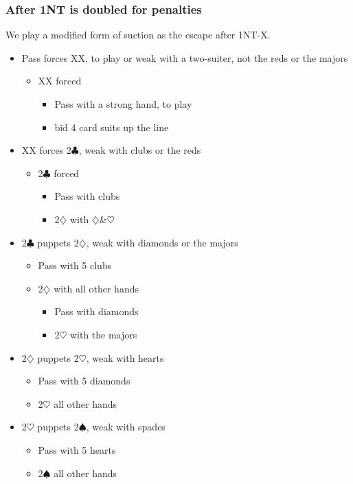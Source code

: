 \documentclass[a4paper,14pt]{extarticle}
\begin{document}
\newpage

\subsubsection{After 1NT is doubled for penalties}
\label{sec:resp:1nx}
\label{note:20}

We play a modified form of suction as the escape after 1NT-X.

\begin{itemize}
\item Pass forces XX, to play or weak with a two-suiter, not the reds or the majors
	\begin{itemize}
	\item XX forced
		\begin{itemize}
		\item Pass with a strong hand, to play
		\item bid 4 card suits up the line
		\end{itemize}
	\end{itemize}
\item XX forces 2$\clubsuit$, weak with clubs or the reds
	\begin{itemize}
	\item 2$\clubsuit$ forced
		\begin{itemize}
		\item Pass with clubs
		\item 2$\diamondsuit$ with $\diamondsuit$\&$\heartsuit$
		\end{itemize}
	\end{itemize}
\item 2$\clubsuit$ puppets 2$\diamondsuit$, weak with diamonds or the majors
	\begin{itemize}
	\item Pass with 5 clubs
	\item 2$\diamondsuit$ with all other hands
		\begin{itemize}
		\item Pass with diamonds
		\item 2$\heartsuit$ with the majors
		\end{itemize}
	\end{itemize}
\item 2$\diamondsuit$ puppets 2$\heartsuit$, weak with hearts
	\begin{itemize}
	\item Pass with 5 diamonds
	\item 2$\heartsuit$ all other hands
	\end{itemize}
\item 2$\heartsuit$ puppets 2$\spadesuit$, weak with spades
	\begin{itemize}
	\item Pass with 5 hearts
	\item 2$\spadesuit$ all other hands
	\end{itemize}
\end{itemize}
\end{document}
